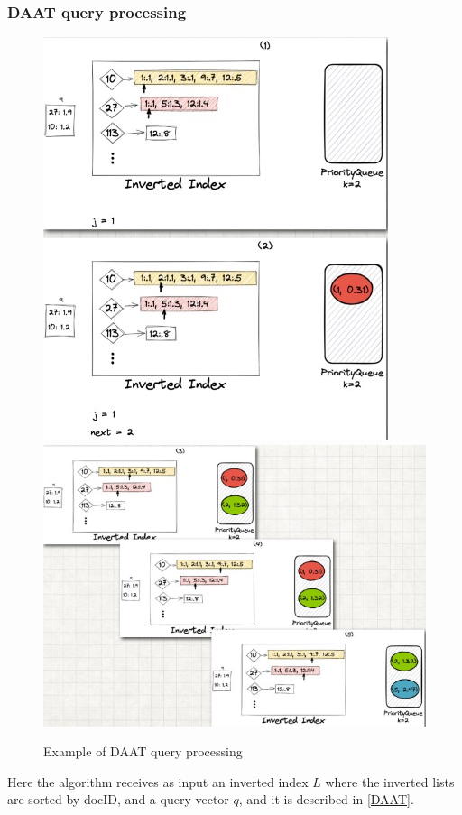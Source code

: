 \subsubsection{DAAT query processing}

\begin{figure}[h!]
		\centering
		\includegraphics[scale = 1.8]{img/daat.jpg}
        \includegraphics[scale = 1.8]{img/daat 2.jpg}
        \label{daat}
        \caption{Example of DAAT query processing}
\end{figure}

Here the algorithm receives as input an inverted index $L$ where the inverted lists are sorted by docID, and a query vector $q$, and it is described in \ref{DAAT}.

